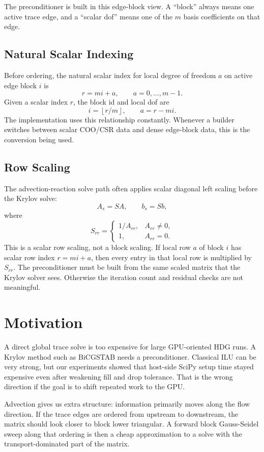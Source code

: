 \documentclass[11pt]{article}
\newcommand{\code}[1]{\texttt{\detokenize{#1}}}
\begin{document}
The preconditioner is built in this edge-block view.  A ``block'' always means
one active trace edge, and a ``scalar dof'' means one of the \(m\) basis
coefficients on that edge.

\subsection{Natural Scalar Indexing}

Before ordering, the natural scalar index for local degree of freedom \(a\) on
active edge block \(i\) is
\[
  r = mi + a, \qquad a=0,\ldots,m-1.
\]
Given a scalar index \(r\), the block id and local dof are
\[
  i = \left\lfloor r/m \right\rfloor, \qquad a = r - mi.
\]
The implementation uses this relationship constantly.  Whenever a builder
switches between scalar COO/CSR data and dense edge-block data, this is the
conversion being used.

\subsection{Row Scaling}

The advection-reaction solve path often applies scalar diagonal left scaling
before the Krylov solve:
\[
  A_s = S A, \qquad b_s = S b,
\]
where
\[
  S_{rr} = \begin{cases}
    1 / A_{rr}, & A_{rr}\neq 0,\\
    1, & A_{rr}=0.
  \end{cases}
\]
This is a scalar row scaling, not a block scaling.  If local row \(a\) of block
\(i\) has scalar row index \(r=mi+a\), then every entry in that local row is
multiplied by \(S_{rr}\).  The preconditioner must be built from the same
scaled matrix that the Krylov solver sees.  Otherwise the iteration count and
residual checks are not meaningful.

\section{Motivation}
\label{sec:motivation}

A direct global trace solve is too expensive for large GPU-oriented HDG runs.
A Krylov method such as BiCGSTAB needs a preconditioner.  Classical ILU can be
very strong, but our experiments showed that host-side SciPy \code{spilu}
setup time stayed expensive even after weakening fill and drop tolerance.
That is the wrong direction if the goal is to shift repeated work to the GPU.

Advection gives us extra structure: information primarily moves along the flow
direction.  If the trace edges are ordered from upstream to downstream, the
matrix should look closer to block lower triangular.  A forward block
Gauss-Seidel sweep along that ordering is then a cheap approximation to a solve
with the transport-dominated part of the matrix.
\end{document}

